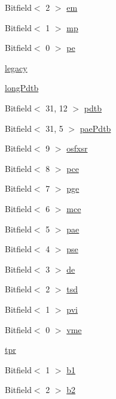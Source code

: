 \begin{DoxyCompactItemize}
Bitfield$<$ 2 $>$ \hyperlink{namespaceX86ISA_acee3b5ece28581fdc0421d3ba9075206}{em}
\item 
Bitfield$<$ 1 $>$ \hyperlink{namespaceX86ISA_a55c6443d5217f304a354dbbc1d68104d}{mp}
\item 
Bitfield$<$ 0 $>$ \hyperlink{namespaceX86ISA_ab9c99c1c3f79c5fdf512fbbdde6987fd}{pe}
\item 
\hyperlink{namespaceX86ISA_a3e52083252dffea91cf4b0d6839aca98}{legacy}
\item 
\hyperlink{namespaceX86ISA_aee088cd6dd28dd87a6443b5a5d452934}{longPdtb}
\item 
Bitfield$<$ 31, 12 $>$ \hyperlink{namespaceX86ISA_a808b05a84532a0f0cdeca54f8acb1805}{pdtb}
\item 
Bitfield$<$ 31, 5 $>$ \hyperlink{namespaceX86ISA_aa0dc6bf9434d254fe46675836df602fb}{paePdtb}
\item 
Bitfield$<$ 9 $>$ \hyperlink{namespaceX86ISA_afe6ac2119e4f170d0e61483592f6d3bb}{osfxsr}
\item 
Bitfield$<$ 8 $>$ \hyperlink{namespaceX86ISA_a8c5ffb3ffc61a4ce7dccf304f9fd84f0}{pce}
\item 
Bitfield$<$ 7 $>$ \hyperlink{namespaceX86ISA_a8e4b3401b4f0c45853211157c986b0e1}{pge}
\item 
Bitfield$<$ 6 $>$ \hyperlink{namespaceX86ISA_a38e98e0739e0d4b29c798d8f69a377ac}{mce}
\item 
Bitfield$<$ 5 $>$ \hyperlink{namespaceX86ISA_a70a626ed63d72e66a1e67381794a8170}{pae}
\item 
Bitfield$<$ 4 $>$ \hyperlink{namespaceX86ISA_adb05259045fc2661ea7f3167e810b729}{pse}
\item 
Bitfield$<$ 3 $>$ \hyperlink{namespaceX86ISA_a0155ffdb32dd053335f7dca7c327747d}{de}
\item 
Bitfield$<$ 2 $>$ \hyperlink{namespaceX86ISA_a92827ba3eedf522fd3c986cb614c6695}{tsd}
\item 
Bitfield$<$ 1 $>$ \hyperlink{namespaceX86ISA_ad0016b5b875a75c086702749b45a0a12}{pvi}
\item 
Bitfield$<$ 0 $>$ \hyperlink{namespaceX86ISA_ab59380367409ca4c8224a45b9845d0c8}{vme}
\item 
\hyperlink{namespaceX86ISA_aff8a5063d0980da344ceaabe6bfcbb9b}{tpr}
\item 
Bitfield$<$ 1 $>$ \hyperlink{namespaceX86ISA_a66555249fda949dad20c4b90ea4fb029}{b1}
\item 
Bitfield$<$ 2 $>$ \hyperlink{namespaceX86ISA_a69d3dc3105a3855e17424d45818c6935}{b2}
\item 

\end{DoxyCompactItemize}
